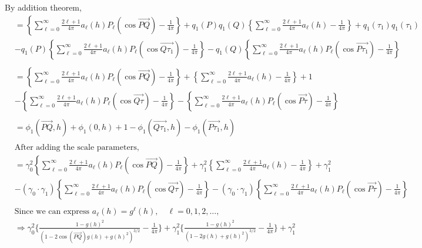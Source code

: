 \documentclass[11pt]{article}
\begin{document}
\begin{itemize}
By addition theorem,\\
\begin{align*}
&= \left\{ \sum_{\ell=0}^\infty \frac{2\ell+1}{4\pi} a_\ell(h) P_\ell(\cos{\overrightarrow{PQ}}) - \frac{1}{4\pi} \right\} + q_1(P) q_1(Q) \left\{ \sum_{\ell=0}^{\infty}  \frac{2\ell+1}{4\pi} a_{\ell}(h) - \frac{1}{4\pi} \right\} + q_1(\tau_1) q_1(\tau_1)\\
&- q_1(P) \left\{ \sum_{\ell=0}^{\infty}  \frac{2\ell+1}{4\pi} a_{\ell}(h)  P_\ell(\cos{\overrightarrow{Q\tau_1}}) - \frac{1}{4\pi} \right\} - q_1(Q) \left\{ \sum_{\ell=0}^{\infty}  \frac{2\ell+1}{4\pi} a_{\ell}(h)  P_\ell(\cos{\overrightarrow{P \tau_1}}) - \frac{1}{4\pi} \right\}\\
\\
&= \left\{ \sum_{\ell=0}^\infty \frac{2\ell+1}{4\pi} a_\ell(h) P_\ell(\cos{\overrightarrow{PQ}}) - \frac{1}{4\pi} \right\} + \left\{ \sum_{\ell=0}^{\infty}  \frac{2\ell+1}{4\pi} a_{\ell}(h) - \frac{1}{4\pi} \right\} + 1\\
&- \left\{ \sum_{\ell=0}^{\infty}  \frac{2\ell+1}{4\pi} a_{\ell}(h)  P_\ell(\cos{\overrightarrow{Q\tau}}) - \frac{1}{4\pi} \right\} - \left\{ \sum_{\ell=0}^{\infty}  \frac{2\ell+1}{4\pi} a_{\ell}(h)  P_\ell(\cos{\overrightarrow{P \tau}}) - \frac{1}{4\pi} \right\}\\
\\
&= \phi_1(\overrightarrow{PQ},h) + \phi_1(0,h) + 1 - \phi_1(\overrightarrow{Q\tau_1},h)  - \phi_1(\overrightarrow{P\tau_1},h)\\
\\
&\text{After adding the scale parameters, }\\
&= \gamma_0^2 \left\{ \sum_{\ell=0}^\infty \frac{2\ell+1}{4\pi} a_\ell(h) P_\ell(\cos{\overrightarrow{PQ}}) - \frac{1}{4\pi} \right\} + \gamma_1^2 \left\{ \sum_{\ell=0}^{\infty}  \frac{2\ell+1}{4\pi} a_{\ell}(h) - \frac{1}{4\pi} \right\} + \gamma_1^2\\
&- (\gamma_0 \cdot \gamma_1) \left\{ \sum_{\ell=0}^{\infty}  \frac{2\ell+1}{4\pi} a_{\ell}(h) P_\ell(\cos{\overrightarrow{Q\tau}}) - \frac{1}{4\pi} \right\} - (\gamma_0 \cdot \gamma_1) \left\{ \sum_{\ell=0}^{\infty}  \frac{2\ell+1}{4\pi} a_{\ell}(h) P_\ell(\cos{\overrightarrow{P \tau}}) - \frac{1}{4\pi} \right\}\\
\\
&\text{Since we can express $a_\ell(h) = g^{\ell}(h), \quad \ell=0,1,2, \dots$},\\
&\Rightarrow \gamma_0^2 \biggl\{ \frac{1 - g(h)^2}{(1-2 \cos{(\overrightarrow{PQ})} g(h) + g(h)^2)^{3/2}} - \frac{1}{4\pi} \biggl\} + \gamma_1^2 \biggl\{ \frac{1 - g(h)^2}{(1-2 g(h) + g(h)^2)^{3/2}}  - \frac{1}{4\pi} \biggl\} + \gamma_1^2\\ 

\end{align*}
\end{itemize}
\end{document}
